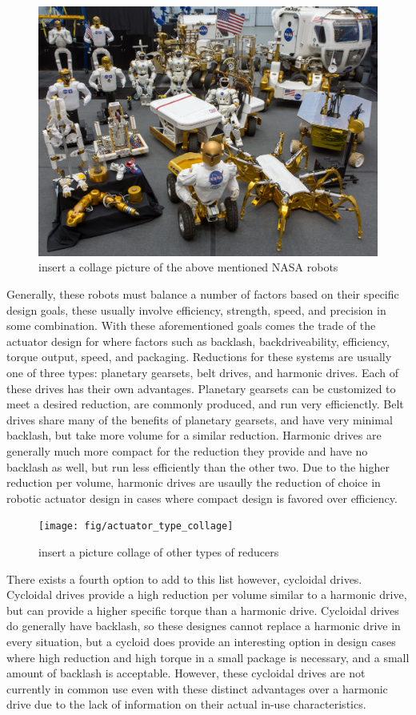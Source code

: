 \begin{figure}[!b]
   \centering
   \includegraphics[width=0.7\linewidth]{fig/robot_collage}
   \caption{insert a collage picture of the above mentioned NASA robots}
   \label{fig/robot_collage}
\end{figure}


Generally, these robots must balance a number of factors based on their specific design goals, these usually involve efficiency, strength, speed, and precision in some combination. 
With these aforementioned goals comes the trade of the actuator design for where factors such as backlash, backdriveability, efficiency, torque output, speed, and packaging. 
Reductions for these systems are usually one of three types: planetary gearsets, belt drives, and harmonic drives. 
Each of these drives has their own advantages. 
Planetary gearsets can be customized to meet a desired reduction, are commonly produced, and run very efficienctly.
Belt drives share many of the benefits of planetary gearsets, and have very minimal backlash, but take more volume for a similar reduction. 
Harmonic drives are generally much more compact for the reduction they provide and have no backlash as well, but run less efficiently than the other two. 
Due to the higher reduction per volume, harmonic drives are usaully the reduction of choice in robotic actuator design in cases where compact design is favored over efficiency.

\begin{figure}[!b]
   \centering
   \texttt{[image: fig/actuator\_type\_collage]}
   \caption{insert a picture collage of other types of reducers}
   \label{fig:reducer_collage}
\end{figure}

There exists a fourth option to add to this list however, cycloidal drives. 
Cycloidal drives provide a high reduction per volume similar to a harmonic drive, but can provide a higher specific torque than a harmonic drive. 
Cycloidal drives do generally have backlash, so these designes cannot replace a harmonic drive in every situation, but a cycloid does provide an interesting option in design cases where high reduction and high torque in a small package is necessary, and a small amount of backlash is acceptable. 
However, these cycloidal drives are not currently in common use even with these distinct advantages over a harmonic drive due to the lack of information on their actual in-use characteristics. 

